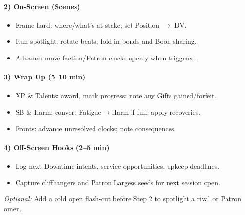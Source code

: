 \paragraph{2) On-Screen (Scenes)}
\begin{itemize}
  \item Frame hard: where/what’s at stake; set Position $\to$ DV.
  \item Run spotlight: rotate beats; fold in bonds and Boon sharing.
  \item Advance: move faction/Patron clocks openly when triggered.
\end{itemize}

\paragraph{3) Wrap-Up (5–10 min)}
\begin{itemize}
  \item XP \& Talents: award, mark progress; note any Gifts gained/forfeit.
  \item SB \& Harm: convert Fatigue$\to$Harm if full; apply recoveries.
  \item Fronts: advance unresolved clocks; note consequences.
\end{itemize}

\paragraph{4) Off-Screen Hooks (2–5 min)}
\begin{itemize}
  \item Log next Downtime intents, service opportunities, upkeep deadlines.
  \item Capture cliffhangers and Patron Largess seeds for next session open.
\end{itemize}

\emph{Optional:} Add a cold open flash-cut before Step 2 to spotlight a rival or Patron omen.
